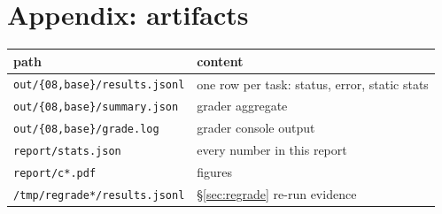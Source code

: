 \documentclass[10pt,a4paper]{article}
\begin{document}
\section*{Appendix: artifacts}
\small
\begin{tabular}{ll}
\toprule
path & content \\
\midrule
\texttt{out/\{08,base\}/results.jsonl} & one row per task: status, error, static stats \\
\texttt{out/\{08,base\}/summary.json}  & grader aggregate \\
\texttt{out/\{08,base\}/grade.log}     & grader console output \\
\texttt{report/stats.json}            & every number in this report \\
\texttt{report/c*.pdf}                & figures \\
\texttt{/tmp/regrade*/results.jsonl}  & \S\ref{sec:regrade} re-run evidence \\
\bottomrule
\end{tabular}
\end{document}
